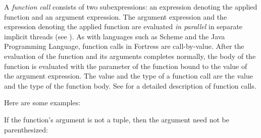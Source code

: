A \emph{function call} consists of two subexpressions: an expression
denoting the applied function and an argument expression.  The
argument expression and the expression denoting the applied function
are evaluated \emph{in parallel} in separate implicit threads (see
).  As with languages such as Scheme and
the Java Programming Language, function calls in Fortress are
call-by-value.  After the evaluation of the function and its arguments
completes normally,
the body of the function is evaluated with the parameter of the
function bound to the value of the argument expression.
The value and the type of a function call are the value and the type of
the function body.
See  for a detailed description of function calls.


Here are some examples:

If the function's argument is not a tuple, then the argument need not be
parenthesized:


